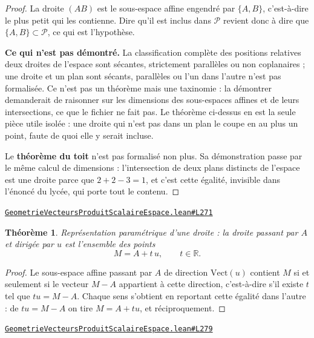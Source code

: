 \documentclass[11pt,a4paper]{article}
\theoremstyle{definition}
\theoremstyle{plain}
\newtheorem{theoreme}{Théorème}
\newcommand{\source}[2]{\par\smallskip\noindent\hfill{\footnotesize\href{#1}{\texttt{#2}}}\par\smallskip}
\begin{document}
\begin{proof}
La droite $(AB)$ est le sous-espace affine engendré par $\{A, B\}$, c'est-à-dire le plus
petit qui les contienne. Dire qu'il est inclus dans $\mathcal{P}$ revient donc à dire que
$\{A, B\} \subset \mathcal{P}$, ce qui est l'hypothèse.

\medskip\noindent
\textbf{Ce qui n'est pas démontré.} La classification complète des positions relatives
\textemdash{} deux droites de l'espace sont sécantes, strictement parallèles ou non
coplanaires ; une droite et un plan sont sécants, parallèles ou l'un dans l'autre
\textemdash{} n'est pas formalisée. Ce n'est pas un théorème mais une taxinomie : la
démontrer demanderait de raisonner sur les dimensions des sous-espaces affines et de leurs
intersections, ce que le fichier ne fait pas. Le théorème ci-dessus en est la seule pièce
utile isolée : une droite qui n'est pas dans un plan le coupe en au plus un point, faute de
quoi elle y serait incluse.

\medskip\noindent
Le \textbf{théorème du toit} n'est pas formalisé non plus. Sa démonstration passe par le
même calcul de dimensions : l'intersection de deux plans distincts de l'espace est une
droite parce que $2 + 2 - 3 = 1$, et c'est cette égalité, invisible dans l'énoncé du
lycée, qui porte tout le contenu.
\end{proof}
\source{https://github.com/Commutator-IO/learn-lean/blob/main/courses/02-lycee/08-geometrie-vecteurs-produit-scalaire-espace/GeometrieVecteursProduitScalaireEspace.lean\#L271}{GeometrieVecteursProduitScalaireEspace.lean\#L271}

\begin{theoreme}
Représentation paramétrique d'une droite : la droite passant par $A$ et dirigée par $u$
est l'ensemble des points
\[ M = A + t\,u , \qquad t \in \mathbb{R} . \]
\end{theoreme}

\begin{proof}
Le sous-espace affine passant par $A$ de direction $\mathrm{Vect}(u)$ contient $M$ si et
seulement si le vecteur $M - A$ appartient à cette direction, c'est-à-dire s'il existe $t$
tel que $tu = M - A$. Chaque sens s'obtient en reportant cette égalité dans l'autre : de
$tu = M - A$ on tire $M = A + tu$, et réciproquement.
\end{proof}
\source{https://github.com/Commutator-IO/learn-lean/blob/main/courses/02-lycee/08-geometrie-vecteurs-produit-scalaire-espace/GeometrieVecteursProduitScalaireEspace.lean\#L279}{GeometrieVecteursProduitScalaireEspace.lean\#L279}
\end{document}
